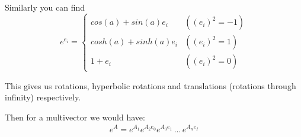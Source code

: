 \documentclass[twoside]{article}
\newcommand{\B}[1]{\left(#1\right)} %
\begin{document}
\begin{multicols*}{2}
$$\begin{aligned}
                \end{aligned}$$
            \par
                Similarly you can find
                $$ e^{e_i} = \begin{cases}
                    cos(a) + sin(a) e_i & (\B{e_i}^2 = -1) \\
                    cosh(a) + sinh(a) e_i & (\B{e_i}^2 = 1) \\
                    1 + e_i & (\B{e_i}^2 = 0)
                    \end{cases}$$
            \par
                This gives us rotations, hyperbolic rotations and translations (rotations through infinity) respectively.
            \par
                Then for a multivector we would have:
                \begin{gather*}
                    e^A = e^{A_1} e^{A_2 e_0} e^{A_3 e_1} \, ... \, e^{A_n e_I} \\
                \end{gather*}

\end{multicols*}
\end{document}
